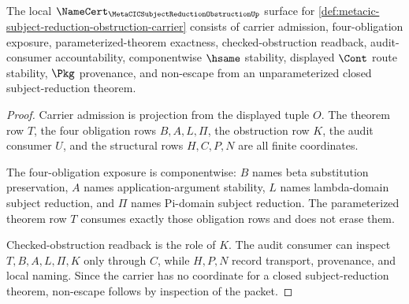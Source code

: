 \begin{theorem}
\label{thm:metacic-subject-reduction-obstruction-namecert-obligations}
The local $\NameCert_{\MetaCICSubjectReductionObstructionUp}$ surface for \autoref{def:metacic-subject-reduction-obstruction-carrier} consists of carrier admission, four-obligation exposure, parameterized-theorem exactness, checked-obstruction readback, audit-consumer accountability, componentwise $\hsame$ stability, displayed $\Cont$ route stability, $\Pkg$ provenance, and non-escape from an unparameterized closed subject-reduction theorem.
\end{theorem}
\begin{proof}
Carrier admission is projection from the displayed tuple $O$. The theorem row $T$, the four obligation rows $B,A,L,\Pi$, the obstruction row $K$, the audit consumer $U$, and the structural rows $H,C,P,N$ are all finite coordinates.

The four-obligation exposure is componentwise: $B$ names beta substitution preservation, $A$ names application-argument stability, $L$ names lambda-domain subject reduction, and $\Pi$ names Pi-domain subject reduction. The parameterized theorem row $T$ consumes exactly those obligation rows and does not erase them.

Checked-obstruction readback is the role of $K$. The audit consumer can inspect $T,B,A,L,\Pi,K$ only through $C$, while $H,P,N$ record transport, provenance, and local naming. Since the carrier has no coordinate for a closed subject-reduction theorem, non-escape follows by inspection of the packet.
\end{proof}


